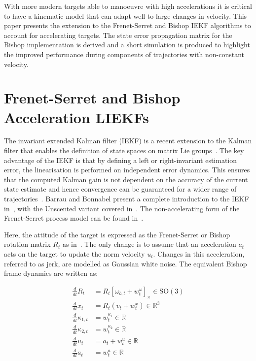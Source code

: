 \documentclass[11pt]{article}
\begin{document}
With more modern targets able to manoeuvre with high accelerations it is critical to have a kinematic model that can adapt well to large changes in velocity. This paper presents the extension to the Frenet-Serret and Bishop IEKF algorithms to account for accelerating targets. The state error propagation matrix for the Bishop implementation is derived and a short simulation is produced to highlight the improved performance during components of trajectories with non-constant velocity.

\section{Frenet-Serret and Bishop Acceleration LIEKFs}

The invariant extended Kalman filter (IEKF) is a recent extension to the Kalman filter that enables the definition of state spaces on matrix Lie groups~\cite{bonnabel2007left}. The key advantage of the IEKF is that by defining a left or right-invariant estimation error, the linearisation is performed on independent error dynamics. This ensures that the computed Kalman gain is not dependent on the accuracy of the current state estimate and hence convergence can be guaranteed for a wider range of trajectories~\cite{barrau2016invariant}. Barrau and Bonnabel present a complete introduction to the IEKF in~\cite{barrau2018invariant}, with the Unscented variant covered in~\cite{brossard2020code}. The non-accelerating form of the Frenet-Serret process model can be found in~\cite{pilte2017tracking, marion2019invariant}.

Here, the attitude of the target is expressed as the Frenet-Serret or Bishop rotation matrix $R_t$ as in~\cite{pilte2017tracking}. The only change is to assume that an acceleration $a_t$ acts on the target to update the norm velocity $u_t$. Changes in this acceleration, referred to as jerk, are modelled as Gaussian white noise. The equivalent Bishop frame dynamics are written as:

\begin{equation}
\begin{aligned}
\frac{d}{dt} R_t &= R_t[\omega_{b,t} + w^\omega_t]_\times \in \mathrm{SO}(3) \\
\frac{d}{dt} x_t &= R_t(v_t + w^x_t) \in \mathbb{R}^3 \\
\frac{d}{dt} \kappa_{1,t} &= w^{\kappa_1}_t \in \mathbb{R} \\
\frac{d}{dt} \kappa_{2,t} &= w^{\kappa_2}_t \in \mathbb{R} \\
\frac{d}{dt} u_t &= a_t + w^u_t \in \mathbb{R} \\
\frac{d}{dt} a_t &= w^a_t \in \mathbb{R}
\end{aligned}
\label{eq:bishop_dyn}
\end{equation}
\end{document}
